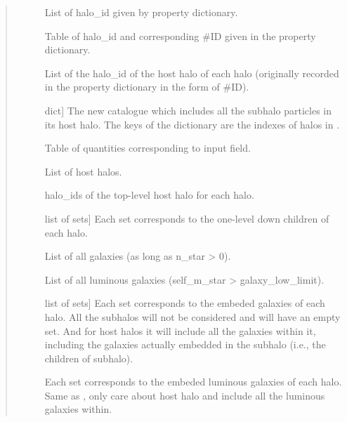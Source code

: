 \documentclass[letterpaper,10pt,english]{sphinxmanual}
\begin{document}
\begin{fulllineitems}
\begin{quote}
\begin{description}
\begin{description}
\item[{}] \leavevmode
List of halo\_id given by property dictionary.

\item[{}] \leavevmode
Table of halo\_id and corresponding \#ID given in the property 
dictionary.

\item[{}] \leavevmode
List of the halo\_id of the host halo of each halo (originally 
recorded in the property dictionary in the form of \#ID).

\item[{}] \leavevmode{[}dict{]}
The new catalogue which includes all the subhalo particles 
in its host halo. The keys of the dictionary are the indexes of 
halos in .

\item[{}] \leavevmode
Table of quantities corresponding to input field.

\item[{}] \leavevmode
List of host halos.

\item[{}] \leavevmode
halo\_ids of the top-level host halo for each halo.

\item[{}] \leavevmode{[}list of sets{]}
Each set corresponds to the one-level down children of each halo.

\item[{}] \leavevmode
List of all galaxies (as long as n\_star \textgreater{} 0).

\item[{}] \leavevmode
List of all luminous galaxies (self\_m\_star \textgreater{} galaxy\_low\_limit).

\item[{}] \leavevmode{[}list of sets{]}
Each set corresponds to the embeded galaxies of each halo. All 
the subhalos will not be considered and will have an empty set. 
And for host halos it will include all the galaxies within it, 
including the galaxies actually embedded in the subhalo (i.e., 
the children of subhalo).

\item[{}] \leavevmode
Each set corresponds to the embeded luminous galaxies of each 
halo. Same as , only care about host halo and include 
all the luminous galaxies within.


\end{description}
\end{description}
\end{quote}
\end{fulllineitems}
\end{document}

